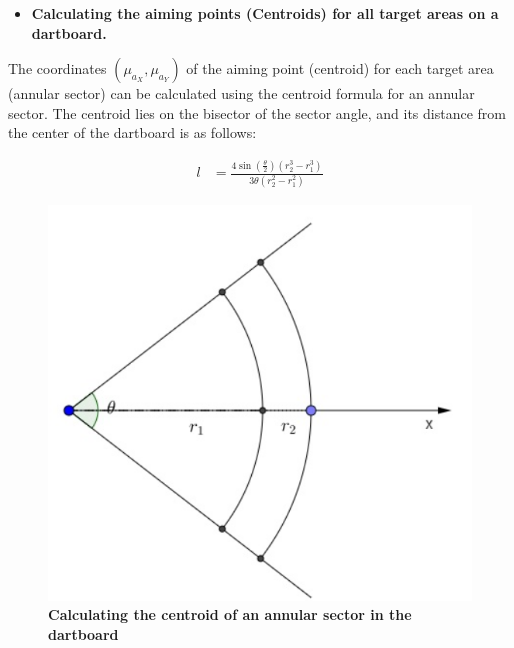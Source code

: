 \documentclass[cjjs]{ipart}
\theoremstyle{plain}
\begin{document}
\begin{itemize}
    \item \textbf{Calculating the aiming points (Centroids) for all target areas on a dartboard.}
\end{itemize}

The coordinates $(\mu_{a_X}, \mu_{a_Y})$ of the aiming point (centroid) for each target area (annular sector) can be calculated using the centroid formula for an annular sector. The centroid lies on the bisector of the sector angle, and its distance from the center of the dartboard is as follows:

\begin{figure}[h]
    \centering
    \begin{minipage}{0.48\textwidth}
        \centering
        \begin{align*}
        l &= \frac{4 \sin\left(\frac{\theta}{2}\right) \left( r_2^3 - r_1^3 \right)}{3 \theta \left( r_2^2 - r_1^2 \right)}
        \end{align*}
    \end{minipage}
    \hspace{0.02\textwidth} 
    \begin{minipage}{0.48\textwidth} 
        \centering
        \includegraphics[width=\textwidth]{9.png}
    \end{minipage}
    \caption{\textbf{Calculating the centroid of an annular sector in the dartboard}}
\end{figure}
\end{document}
